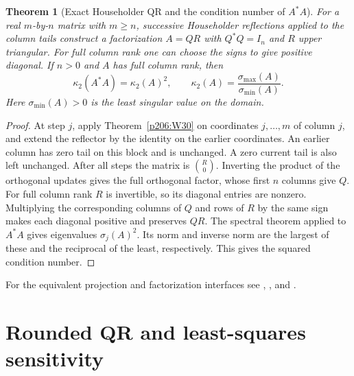 \documentclass[11pt,oneside,openany]{book}
\theoremstyle{plain}
\newtheorem{theorem}{Theorem}[chapter]
\theoremstyle{definition}
\theoremstyle{remark}
\begin{document}
\begin{theorem}[Exact Householder QR and the condition number of \(A^*A\)]
\label{p206:W31}
For a real \(m\)-by-\(n\) matrix with \(m\ge n\), successive
Householder reflections applied to the column tails construct a
factorization \(A=QR\) with \(Q^*Q=I_n\) and \(R\) upper
triangular. For full column rank one can choose the signs to
give positive diagonal. If \(n>0\) and \(A\) has full column
rank, then
\[
       \kappa_2(A^*A)=\kappa_2(A)^2,\qquad
       \kappa_2(A)=\frac{\sigma_{\max}(A)}{\sigma_{\min}(A)}.
\]
Here \(\sigma_{\min}(A)>0\) is the least singular value on
the domain.
\end{theorem}

\begin{proof}
At step \(j\), apply Theorem~\ref{p206:W30} on coordinates
\(j,\ldots,m\) of column \(j\), and extend the reflector by
the identity on the earlier coordinates. An earlier column
has zero tail on this block and is unchanged. A zero current
tail is also left unchanged. After all steps the matrix is
\(\binom{R}{0}\). Inverting the product of the orthogonal
updates gives the full orthogonal factor, whose first \(n\)
columns give \(Q\). For full column rank \(R\) is invertible,
so its diagonal entries are nonzero. Multiplying the
corresponding columns of \(Q\) and rows of \(R\) by the same
sign makes each diagonal positive and preserves \(QR\).
The spectral theorem applied to \(A^*A\) gives eigenvalues
\(\sigma_j(A)^2\). Its norm and inverse norm are the largest
of these and the reciprocal of the least, respectively. This
gives the squared condition number.
\end{proof}

For the equivalent projection and factorization interfaces see
\cite[entries 14.least\_squares, 14.normal\_equations, and
14.qr\_cholesky]{d05}, \cite[Sections~5.1--5.3]{golub}, and
\cite[Chapters~19--20]{higham}.

\section{Rounded QR and least-squares sensitivity}
\end{document}
